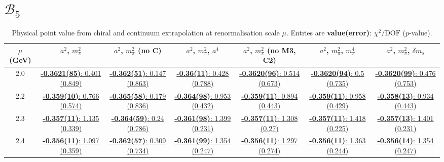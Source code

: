 \documentclass[12pt]{extarticle}
\begin{document}
\section{$\mathcal{B}_5$}
\begin{table}[h!]
\begin{center}
\begin{tabular}{|c|c|c|c|c|c|c|}
\hline
$\mu$ (GeV) & $a^2$, $m_\pi^2$& $a^2$, $m_\pi^2$ (no C)& $a^2$, $m_\pi^2$, $a^4$& $a^2$, $m_\pi^2$ (no M3, C2)& $a^2$, $m_\pi^2$, $m_\pi^4$& $a^2$, $m_\pi^2$, $\delta m_s$\\
\hline
2.0& \hyperlink{TT/NPR/a2m2_20.pdf.1}{\textbf{-0.3621(85)}: 0.401 (0.849)} & \hyperlink{TT/NPR/a2m2noC_20.pdf.1}{\textbf{-0.362(51)}: 0.147 (0.863)} & \hyperlink{TT/NPR/a2a4m2_20.pdf.1}{\textbf{-0.36(11)}: 0.428 (0.788)} & \hyperlink{TT/NPR/a2m2mcut_20.pdf.1}{\textbf{-0.3620(96)}: 0.514 (0.673)} & \hyperlink{TT/NPR/a2m2m4_20.pdf.1}{\textbf{-0.3620(94)}: 0.5 (0.735)} & \hyperlink{TT/NPR/a2m2delm_20.pdf.1}{\textbf{-0.3620(99)}: 0.476 (0.753)}\\
2.2& \hyperlink{TT/NPR/a2m2_22.pdf.1}{\textbf{-0.359(10)}: 0.766 (0.574)} & \hyperlink{TT/NPR/a2m2noC_22.pdf.1}{\textbf{-0.365(58)}: 0.179 (0.836)} & \hyperlink{TT/NPR/a2a4m2_22.pdf.1}{\textbf{-0.364(98)}: 0.953 (0.432)} & \hyperlink{TT/NPR/a2m2mcut_22.pdf.1}{\textbf{-0.359(11)}: 0.894 (0.443)} & \hyperlink{TT/NPR/a2m2m4_22.pdf.1}{\textbf{-0.359(11)}: 0.958 (0.429)} & \hyperlink{TT/NPR/a2m2delm_22.pdf.1}{\textbf{-0.358(13)}: 0.934 (0.443)}\\
2.3& \hyperlink{TT/NPR/a2m2_23.pdf.1}{\textbf{-0.357(11)}: 1.135 (0.339)} & \hyperlink{TT/NPR/a2m2noC_23.pdf.1}{\textbf{-0.364(59)}: 0.24 (0.786)} & \hyperlink{TT/NPR/a2a4m2_23.pdf.1}{\textbf{-0.361(98)}: 1.399 (0.231)} & \hyperlink{TT/NPR/a2m2mcut_23.pdf.1}{\textbf{-0.357(11)}: 1.308 (0.27)} & \hyperlink{TT/NPR/a2m2m4_23.pdf.1}{\textbf{-0.357(11)}: 1.418 (0.225)} & \hyperlink{TT/NPR/a2m2delm_23.pdf.1}{\textbf{-0.357(13)}: 1.401 (0.231)}\\
2.4& \hyperlink{TT/NPR/a2m2_24.pdf.1}{\textbf{-0.356(11)}: 1.097 (0.359)} & \hyperlink{TT/NPR/a2m2noC_24.pdf.1}{\textbf{-0.362(57)}: 0.309 (0.734)} & \hyperlink{TT/NPR/a2a4m2_24.pdf.1}{\textbf{-0.361(99)}: 1.354 (0.247)} & \hyperlink{TT/NPR/a2m2mcut_24.pdf.1}{\textbf{-0.356(11)}: 1.297 (0.274)} & \hyperlink{TT/NPR/a2m2m4_24.pdf.1}{\textbf{-0.356(11)}: 1.363 (0.244)} & \hyperlink{TT/NPR/a2m2delm_24.pdf.1}{\textbf{-0.356(14)}: 1.354 (0.247)}\\
\hline
\end{tabular}
\caption{Physical point value from chiral and continuum extrapolation at renormalisation scale $\mu$. Entries are \textbf{value(error)}: $\chi^2/\text{DOF}$ ($p$-value).}
\end{center}
\end{table}
\end{document}
